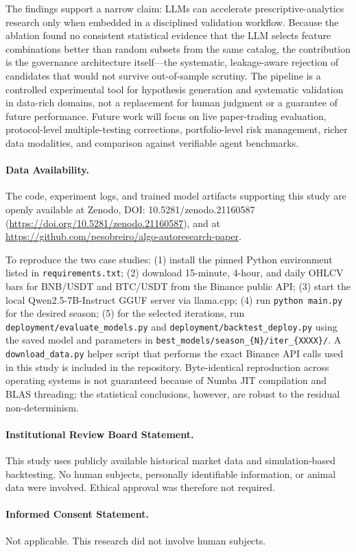 \documentclass[11pt,a4paper]{article}
\newcommand{\dataavailability}[1]{\vspace{1em}\paragraph*{Data Availability.}#1}
\newcommand{\institutionalreview}[1]{\vspace{1em}\paragraph*{Institutional Review Board Statement.}#1}
\newcommand{\informedconsent}[1]{\vspace{1em}\paragraph*{Informed Consent Statement.}#1}
\begin{document}
The findings support a narrow claim: LLMs can accelerate prescriptive-analytics research only when embedded in a disciplined validation workflow. Because the ablation found no consistent statistical evidence that the LLM selects feature combinations better than random subsets from the same catalog, the contribution is the governance architecture itself---the systematic, leakage-aware rejection of candidates that would not survive out-of-sample scrutiny. The pipeline is a controlled experimental tool for hypothesis generation and systematic validation in data-rich domains, not a replacement for human judgment or a guarantee of future performance. Future work will focus on live paper-trading evaluation, protocol-level multiple-testing corrections, portfolio-level risk management, richer data modalities, and comparison against verifiable agent benchmarks.



\vspace{6pt}

\dataavailability{The code, experiment logs, and trained model artifacts supporting this study are openly available at Zenodo, DOI: 10.5281/zenodo.21160587 (\url{https://doi.org/10.5281/zenodo.21160587}), and at \url{https://github.com/pesobreiro/algo-autoresearch-paper}.

To reproduce the two case studies: (1) install the pinned Python environment listed in \texttt{requirements.txt}; (2) download 15-minute, 4-hour, and daily OHLCV bars for BNB/USDT and BTC/USDT from the Binance public API; (3) start the local Qwen2.5-7B-Instruct GGUF server via llama.cpp; (4) run \texttt{python main.py} for the desired season; (5) for the selected iterations, run \texttt{deployment/evaluate\_models.py} and \texttt{deployment/backtest\_deploy.py} using the saved model and parameters in \texttt{best\_models/season\_\{N\}/iter\_\{XXXX\}/}. A \texttt{download\_data.py} helper script that performs the exact Binance API calls used in this study is included in the repository. Byte-identical reproduction across operating systems is not guaranteed because of Numba JIT compilation and BLAS threading; the statistical conclusions, however, are robust to the residual non-determinism.}

\institutionalreview{This study uses publicly available historical market data and simulation-based backtesting. No human subjects, personally identifiable information, or animal data were involved. Ethical approval was therefore not required.}

\informedconsent{Not applicable. This research did not involve human subjects.}
\end{document}
